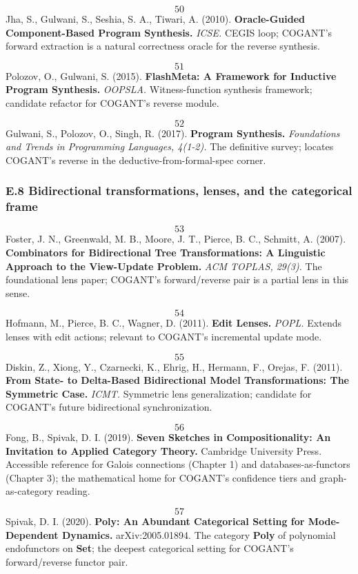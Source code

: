 \documentclass[
]{article}
\begin{document}
\[50\] Jha, S., Gulwani, S., Seshia, S. A., Tiwari, A. (2010).
\textbf{Oracle-Guided Component-Based Program Synthesis.} \emph{ICSE.}
CEGIS loop; COGANT's forward extraction is a natural correctness oracle
for the reverse synthesis.

\[51\] Polozov, O., Gulwani, S. (2015). \textbf{FlashMeta: A Framework
for Inductive Program Synthesis.} \emph{OOPSLA.} Witness-function
synthesis framework; candidate refactor for COGANT's reverse module.

\[52\] Gulwani, S., Polozov, O., Singh, R. (2017). \textbf{Program
Synthesis.} \emph{Foundations and Trends in Programming Languages,
4(1-2).} The definitive survey; locates COGANT's reverse in the
deductive-from-formal-spec corner.

\subsubsection{E.8 Bidirectional transformations, lenses, and the
categorical
frame}\label{e.8-bidirectional-transformations-lenses-and-the-categorical-frame}

\[53\] Foster, J. N., Greenwald, M. B., Moore, J. T., Pierce, B. C.,
Schmitt, A. (2007). \textbf{Combinators for Bidirectional Tree
Transformations: A Linguistic Approach to the View-Update Problem.}
\emph{ACM TOPLAS, 29(3).} The foundational lens paper; COGANT's
forward/reverse pair is a partial lens in this sense.

\[54\] Hofmann, M., Pierce, B. C., Wagner, D. (2011). \textbf{Edit
Lenses.} \emph{POPL.} Extends lenses with edit actions; relevant to
COGANT's incremental update mode.

\[55\] Diskin, Z., Xiong, Y., Czarnecki, K., Ehrig, H., Hermann, F.,
Orejas, F. (2011). \textbf{From State- to Delta-Based Bidirectional
Model Transformations: The Symmetric Case.} \emph{ICMT.} Symmetric lens
generalization; candidate for COGANT's future bidirectional
synchronization.

\[56\] Fong, B., Spivak, D. I. (2019). \textbf{Seven Sketches in
Compositionality: An Invitation to Applied Category Theory.} Cambridge
University Press. Accessible reference for Galois connections (Chapter
1) and databases-as-functors (Chapter 3); the mathematical home for
COGANT's confidence tiers and graph-as-category reading.

\[57\] Spivak, D. I. (2020). \textbf{Poly: An Abundant Categorical
Setting for Mode-Dependent Dynamics.} arXiv:2005.01894. The category
\textbf{Poly} of polynomial endofunctors on \textbf{Set}; the deepest
categorical setting for COGANT's forward/reverse functor pair.
\end{document}
